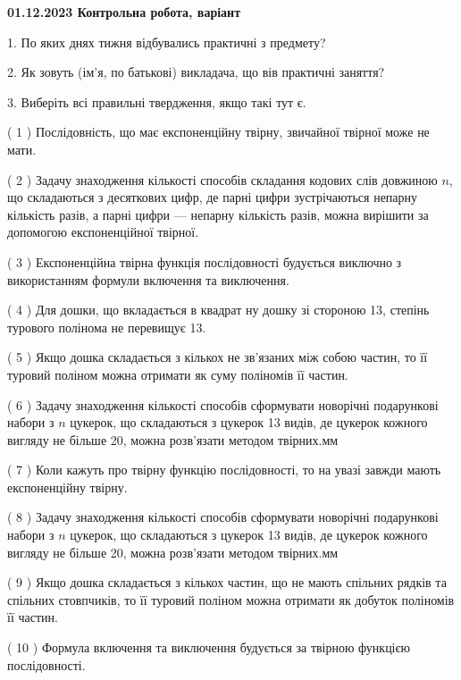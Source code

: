 \documentclass[12pt, ukrainian]{article}
\begin{document}
\vspace{4mm}
\newpage
\begin {large}

\textbf{01.12.2023 Контрольна робота, варіант  }\par


{
1. По яких днях тижня відбувались практичні з предмету?



\vspace{5mm}
2. Як зовуть (ім'я, по батькові) викладача, що вів практичні заняття?



\vspace{5mm}
3. Виберіть всі правильні твердження, якщо такі тут є.\par
\vspace{2mm}
( 1 ) Послідовність, що має експоненційну твірну, звичайної твірної може не мати.%

( 2 ) Задачу знаходження кількості способів складання кодових слів довжиною $n$, що складаються з десяткових цифр, де парні цифри зустрічаються непарну кількість разів, а парні цифри — непарну кількість разів, можна вирішити за допомогою експоненційної твірної.%

( 3 ) Експоненційна твірна функція послідовності будується виключно з використанням формули включення та виключення.%

( 4 ) Для дошки, що вкладається в квадрат ну дошку зі стороною 13, степінь турового полінома не перевищує 13.%

( 5 ) Якщо дошка складається з кількох не зв’язаних між собою частин, то її туровий поліном можна отримати як суму поліномів її частин.%

( 6 ) Задачу знаходження кількості способів сформувати новорічні подарункові набори з $n$ цукерок, що складаються з цукерок 13 видів, де цукерок кожного вигляду не більше 20, можна розв’язати методом твірних.мм%

( 7 ) Коли кажуть про твірну функцію послідовності, то на увазі завжди мають експоненційну твірну.%

( 8 ) Задачу знаходження кількості способів сформувати новорічні подарункові набори з $n$ цукерок, що складаються з цукерок 13 видів, де цукерок кожного вигляду не більше 20, можна розв’язати методом твірних.мм%

( 9 ) Якщо дошка складається з кількох частин, що не мають спільних рядків та спільних стовпчиків, то її туровий поліном можна отримати як добуток поліномів її частин.%

( 10 ) Формула включення та виключення будується за твірною функцією послідовності.%
}
\end {large}
\end{document}
